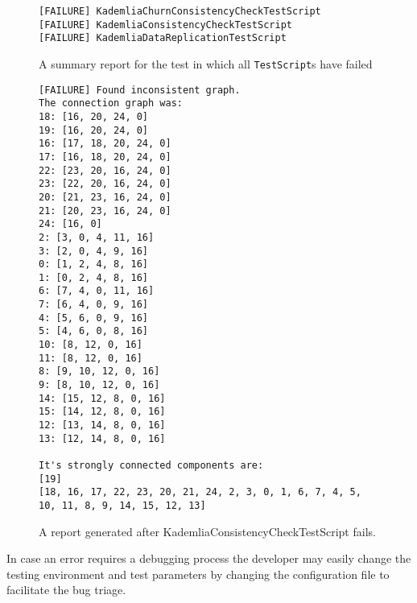 \begin{figure}[tbp]
\begin{verbatim}
[FAILURE] KademliaChurnConsistencyCheckTestScript
[FAILURE] KademliaConsistencyCheckTestScript
[FAILURE] KademliaDataReplicationTestScript
\end{verbatim}
\caption{A summary report for the test in which all \texttt{TestScript}s have
failed}
\label{fig:sumrep_failure}
\end{figure}

\begin{figure}[tbp]
\begin{verbatim}
[FAILURE] Found inconsistent graph.
The connection graph was:
18: [16, 20, 24, 0]
19: [16, 20, 24, 0]
16: [17, 18, 20, 24, 0]
17: [16, 18, 20, 24, 0]
22: [23, 20, 16, 24, 0]
23: [22, 20, 16, 24, 0]
20: [21, 23, 16, 24, 0]
21: [20, 23, 16, 24, 0]
24: [16, 0]
2: [3, 0, 4, 11, 16]
3: [2, 0, 4, 9, 16]
0: [1, 2, 4, 8, 16]
1: [0, 2, 4, 8, 16]
6: [7, 4, 0, 11, 16]
7: [6, 4, 0, 9, 16]
4: [5, 6, 0, 9, 16]
5: [4, 6, 0, 8, 16]
10: [8, 12, 0, 16]
11: [8, 12, 0, 16]
8: [9, 10, 12, 0, 16]
9: [8, 10, 12, 0, 16]
14: [15, 12, 8, 0, 16]
15: [14, 12, 8, 0, 16]
12: [13, 14, 8, 0, 16]
13: [12, 14, 8, 0, 16]

It's strongly connected components are:
[19]
[18, 16, 17, 22, 23, 20, 21, 24, 2, 3, 0, 1, 6, 7, 4, 5, 10, 11, 8, 9, 14, 15, 12, 13]
\end{verbatim}
\caption{A report generated after KademliaConsistencyCheckTestScript fails.}
\label{fig:conrep}
\end{figure}

In case an error requires a debugging process the developer may easily change
the testing environment and test parameters by changing the configuration file
to facilitate the bug triage.
